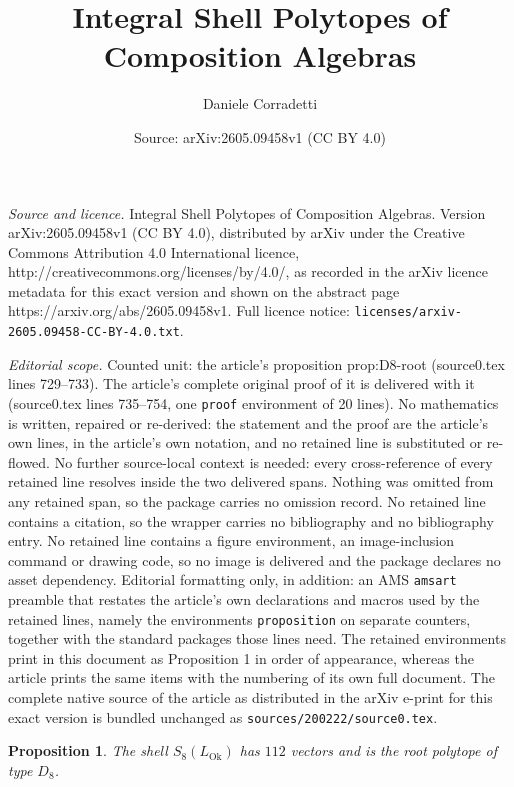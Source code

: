 \documentclass[10pt,a4paper]{amsart}
\title{Integral Shell Polytopes of Composition Algebras}
\author{Daniele Corradetti}
\date{Source: arXiv:2605.09458v1 (CC BY 4.0)}
\newtheorem{proposition}{Proposition}
\newcommand{\LOk}{L_{\mathrm{Ok}}}
\begin{document}
\maketitle

\noindent\emph{Source and licence.} Integral Shell Polytopes of Composition Algebras. Version arXiv:2605.09458v1 (CC BY 4.0), distributed by arXiv under the Creative Commons Attribution 4.0 International licence, http://creativecommons.org/licenses/by/4.0/, as recorded in the arXiv licence metadata for this exact version and shown on the abstract page https://arxiv.org/abs/2605.09458v1. Full licence notice: \texttt{licenses/arxiv-2605.09458-CC-BY-4.0.txt}.\par\smallskip

\noindent\textit{Editorial scope.} Counted unit: the article's proposition prop:D8-root (source0.tex lines 729--733). The article's complete original proof of it is delivered with it (source0.tex lines 735--754, one \texttt{proof} environment of 20 lines). No mathematics is written, repaired or re-derived: the statement and the proof are the article's own lines, in the article's own notation, and no retained line is substituted or re-flowed.  No further source-local context is needed: every cross-reference of every retained line resolves inside the two delivered spans.  Nothing was omitted from any retained span, so the package carries no omission record.  No retained line contains a citation, so the wrapper carries no bibliography and no bibliography entry.  No retained line contains a figure environment, an image-inclusion command or drawing code, so no image is delivered and the package declares no asset dependency.  Editorial formatting only, in addition: an AMS \texttt{amsart} preamble that restates the article's own declarations and macros used by the retained lines, namely the environments \texttt{proposition} on separate counters, together with the standard packages those lines need.  The retained environments print in this document as Proposition 1 in order of appearance, whereas the article prints the same items with the numbering of its own full document.  The complete native source of the article as distributed in the arXiv e-print for this exact version is bundled unchanged as \texttt{sources/200222/source0.tex}.
\begin{proposition}
\label{prop:D8-root}
The shell \(S_8(\LOk)\) has \(112\) vectors and is the root polytope of type
\(D_8\).
\end{proposition}
\end{document}
